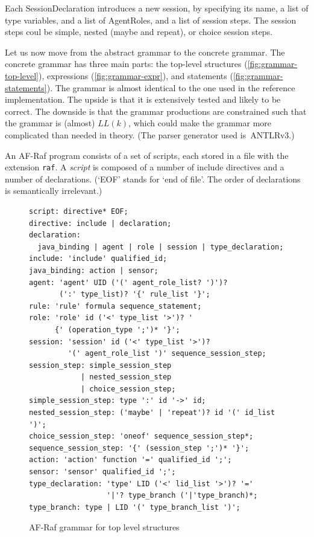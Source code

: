 \documentclass[a4paper,12pt,oneside,fleqn]{book} %
\newcommand{\todo}[1]{[\textcolor{red}{TODO}: #1]}
\begin{document}
{%

Each SessionDeclaration introduces a new session, by specifying its name, a
list of type variables, and a list of AgentRoles, and a list of session
steps. The session steps coul be simple, nested (maybe and repeat), or
choice session steps.

Let us now move from the abstract grammar to the concrete grammar.  The
concrete grammar has three main parts: the top-level structures
(\autoref{fig:grammar-top-level}), expressions
(\autoref{fig:grammar-expr}), and statements
(\autoref{fig:grammar-statements}). The grammar is almost identical to the
one used in the reference implementation. The upside is that it is
extensively tested and likely to be correct. The downside is that the
grammar productions are constrained such that the grammar is (almost)
$LL(k)$, which could make the grammar more complicated than needed in
theory. (The parser generator used is~ANTLRv3.)

An AF-Raf program consists of a set of scripts, each stored in a file with
the extension {\tt raf}.  A {\it script\/} is composed of a number of
include directives and a number of declarations. (`EOF' stands for `end of
file'. The order of declarations is semantically irrelevant.)

\begin{figure}\footnotesize %
\begin{verbatim}
script: directive* EOF;
directive: include | declaration;
declaration:
  java_binding | agent | role | session | type_declaration;
include: 'include' qualified_id;
java_binding: action | sensor;
agent: 'agent' UID ('(' agent_role_list? ')')?
       (':' type_list)? '{' rule_list '}';
rule: 'rule' formula sequence_statement;
role: 'role' id ('<' type_list '>')? '
      {' (operation_type ';')* '}';
session: 'session' id ('<' type_list '>')?
         '(' agent_role_list ')' sequence_session_step;
session_step: simple_session_step
            | nested_session_step
            | choice_session_step;
simple_session_step: type ':' id '->' id;
nested_session_step: ('maybe' | 'repeat')? id '(' id_list ')';
choice_session_step: 'oneof' sequence_session_step*;
sequence_session_step: '{' (session_step ';')* '}';
action: 'action' function '=' qualified_id ';';
sensor: 'sensor' qualified_id ';';
type_declaration: 'type' LID ('<' lid_list '>')? '='
                  '|'? type_branch ('|'type_branch)*;
type_branch: type | LID '(' type_branch_list ')';
\end{verbatim}
\caption{AF-Raf grammar for top level structures}
\label{fig:grammar-top-level}
\end{figure} %

}
\end{document}
